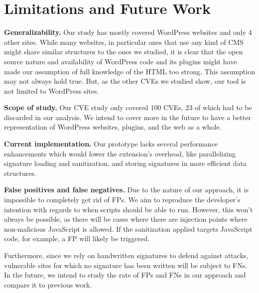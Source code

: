 \section{Limitations and Future Work}

\textbf{Generalizability.} Our study has mostly covered WordPress websites and only 4 other sites. While many websites, in particular ones that use any kind of CMS might share similar structures to the ones we studied, it is clear that the open source nature and availability of WordPress code and its plugins might have made our assumption of full knowledge of the HTML too strong. This assumption may not always hold true. But, as the other CVEs we studied show, our tool is not limited to WordPress sites.

\textbf{Scope of study.} Our CVE study only covered 100 CVEs, 23 of which had to be discarded in our analysis. We intend to cover more in the future to have a better representation of WordPress websites, plugins, and the web as a whole.

\textbf{Current implementation.} %
Our prototype lacks several performance enhancements which would lower the extension's overhead, like parallelizing signature loading and sanitization, and storing signatures in more efficient data structures.

\textbf{False positives and false negatives.} Due to the nature of our approach, it is impossible to completely get rid of FPs. We aim to reproduce the developer's intention with regards to when scripts should be able to run. However, this won't always be possible, as there will be cases where there are injection points where non-malicious JavaScript is allowed. If the sanitization applied targets JavaScript code, for example, a FP will likely be triggered.

Furthermore, since we rely on handwritten signatures to defend against attacks, vulnerable sites for which no signature has been written will be subject to FNs. In the future, we intend to study the rate of FPs and FNs in our approach and compare it to previous work.


